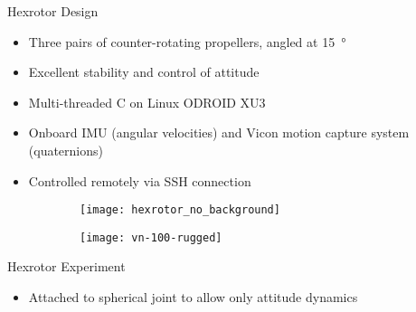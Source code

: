 \documentclass[11pt,professionalfonts]{beamer}
\begin{document}
\begin{frame}{Hexrotor Design} %
	\begin{itemize}
		\item Three pairs of counter-rotating propellers, angled at \SI{15}{\degree}
		\item Excellent stability and control of attitude 
		\item Multi-threaded C on Linux ODROID XU3
		\item Onboard IMU (angular velocities) and Vicon motion capture system (quaternions)
		\item Controlled remotely via SSH connection
	\end{itemize}
	
	\begin{figure} 
		\centering 
		\begin{subfigure}[b]{0.4\textwidth} 
			\texttt{[image: hexrotor\_no\_background]} 
		\end{subfigure}\hfill %
		\begin{subfigure}[b]{0.4\textwidth} 
			\texttt{[image: vn-100-rugged]} 
		\end{subfigure}
	\end{figure}
\end{frame} %

\begin{frame}{Hexrotor Experiment} %
\begin{itemize}
	\item Attached to spherical joint to allow only attitude dynamics
\end{itemize}
\begin{figure}
\centering
{} 
\end{figure}
\end{frame}   %
\end{document}
